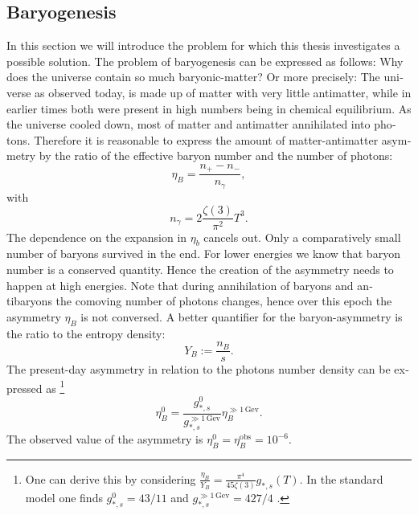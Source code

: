 \documentclass[master,       %
               twoside,        %
               BCOR10mm,       %
               english,ngerman, %
               ]{GAUBM}
\begin{document}
\begin{otherlanguage}{english}
\section{Baryogenesis}
In this section we will introduce the problem for which this thesis investigates a possible solution.
The problem of baryogenesis can be expressed as follows: Why does the universe contain so much baryonic-matter? Or more precisely: The universe as observed today, is made up of matter with very little antimatter, while in earlier times both were present in high numbers being in chemical equilibrium. As the universe cooled down, most of matter and antimatter annihilated into photons. Therefore it is reasonable to express the amount of matter-antimatter asymmetry by the ratio of the effective baryon number and the number of photons:
\begin{equation}
	\eta_B = \frac{n_+ - n_-}{n_\gamma},
\end{equation}
with
\begin{equation}
	n_\gamma = 2 \frac{\zeta(3)}{\pi^2} T^3.
\end{equation}
The dependence on the expansion in $\eta_b$ cancels out.
Only a comparatively small number of baryons survived in the end.
For lower energies we know that baryon number is a conserved quantity. Hence the creation of the asymmetry needs to happen at high energies.
Note that during annihilation of baryons and antibaryons the comoving number of photons changes, hence over this epoch the asymmetry $\eta_B$ is not conversed. A better quantifier for the baryon-asymmetry
is the ratio to the entropy density:
\begin{equation}
	\label{eq:baryon_abundance}
	Y_B := \frac{n_B}{s}.
\end{equation}
The present-day asymmetry in relation to the photons number density can be expressed as \footnote{
One can derive this by considering $\frac{\eta_B}{Y_B} = \frac{\pi^4}{45 \zeta(3)} g_{*, s}(T)$.
In the standard model one finds $g_{*,s}^0 = 43/11$ and $g_{*, s}^{\gg 1 \, \mathrm{Gev}} = 427/4$ \cite[sec. 3.4]{the_early_universe_kolb_and_turner}.
}
\begin{equation}
	\eta_B^0 = \frac{g_{*,s}^0}{g_{*, s}^{\gg 1 \, \mathrm{Gev}}} \eta_B^{\gg 1 \, \mathrm{Gev}}.
\end{equation}
The observed value of the asymmetry is $\eta_B^0 = \eta_B^\mathrm{obs} = 10^{-6}$.


\end{otherlanguage}
\end{document}
